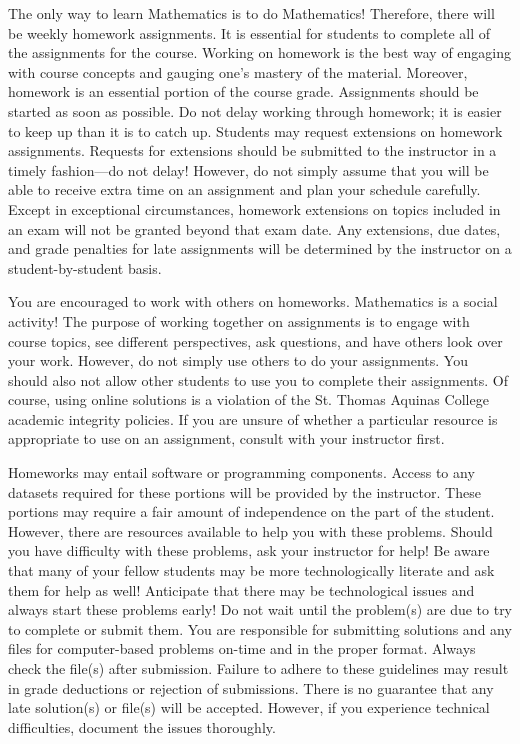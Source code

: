 \documentclass[11pt,letterpaper]{article}
\begin{document}
The only way to learn Mathematics is to do Mathematics! Therefore, there will be weekly homework assignments. It is essential for students to complete all of the assignments for the course. Working on homework is the best way of engaging with course concepts and gauging one's mastery of the material. Moreover, homework is an essential portion of the course grade. Assignments should be started as soon as possible. Do not delay working through homework; it is easier to keep up than it is to catch up. Students may request extensions on homework assignments. Requests for extensions should be submitted to the instructor in a timely fashion---do not delay! However, do not simply assume that you will be able to receive extra time on an assignment and plan your schedule carefully. Except in exceptional circumstances, homework extensions on topics included in an exam will not be granted beyond that exam date. Any extensions, due dates, and grade penalties for late assignments will be determined by the instructor on a student-by-student basis. \pspace

You are encouraged to work with others on homeworks. Mathematics is a social activity! The purpose of working together on assignments is to engage with course topics, see different perspectives, ask questions, and have others look over your work. However, do not simply use others to do your assignments. You should also not allow other students to use you to complete their assignments. Of course, using online solutions is a violation of the St. Thomas Aquinas College academic integrity policies. If you are unsure of whether a particular resource is appropriate to use on an assignment, consult with your instructor first. \pspace

Homeworks may entail software or programming components. Access to any datasets required for these portions will be provided by the instructor. These portions may require a fair amount of independence on the part of the student. However, there are resources available to help you with these problems. Should you have difficulty with these problems, ask your instructor for help! Be aware that many of your fellow students may be more technologically literate and ask them for help as well! Anticipate that there may be technological issues and always start these problems early! Do not wait until the problem(s) are due to try to complete or submit them. You are responsible for submitting solutions and any files for computer-based problems on-time and in the proper format. Always check the file(s) after submission. Failure to adhere to these guidelines may result in grade deductions or rejection of submissions. There is no guarantee that any late solution(s) or file(s) will be accepted. However, if you experience technical difficulties, document the issues thoroughly. 
\sectionbreak
\end{document}
